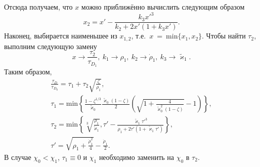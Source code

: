 Отсюда получаем, что $x$ можно приближённо вычислить следующим образом
\begin{equation}
    x_2 = x' - \frac{k_3 x'^3}{k_2 + 2 x' (1 + k_3 x')}.
\end{equation}
Наконец, выбирается наименьшее из $x_{1,2}$, т.е.~$x~=~\text{min}\{x_1, x_2\}$.
Чтобы найти $\tau_2$, выполним следующую замену
\begin{equation}
    x \rightarrow \frac{\tau_2}{\tau_{D_1}} ,\ 
    k_1 \rightarrow \rho_1 ,\ 
    k_2 \rightarrow \dot{\rho}_1 ,\ 
    k_3 \rightarrow \tilde{\varkappa}_1. 
\end{equation}
Таким образом, 
\begin{gather}
    \label{eq:ch3/est0}
    \frac{\tau_D}{\tau_{D_0}} = \tau_1 + \tau_2 \sqrt{\frac{\zeta}{\rho_1}} ,\\
    \label{eq:ch3/est1}
    \tau_1 = \text{min}\left \{ \frac{1 - \zeta ^{1/3}}{\tilde\varkappa_0} \frac{\tilde\varkappa_0 \left( 1 - \zeta \right)}{2}  \left( \sqrt{1 + \frac{4}{\tilde\varkappa_0^2 \left( 1 - \zeta \right)}} - 1 \right) \right \}, \\
    \label{eq:ch3/est2}
    \tau_2 = \text{min}\left\{ \sqrt[3]{\frac{\rho_1}{\tilde\varkappa_1}}, \tau' - \frac{\tilde\varkappa_1 \tau'^3}{\dot\rho_1 + 2\tau' \left( 1 + \tilde\varkappa_1 \tau' \right)} \right\} ,\\
    \tau' = \sqrt{\rho_1 + \frac{\dot\rho_1^2}{4}} - \frac{\dot\rho_1}{2}.
\end{gather}
В случае $\chi_0 < \chi_1$, $\tau_1 \equiv 0$ и $\chi_1$ необходимо заменить на $\chi_0$ в $\tau_2$.

